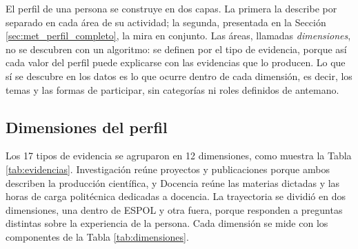 El perfil de una persona se construye en dos capas. La primera la describe por separado en cada área de su actividad; la segunda, presentada en la Sección \ref{sec:met_perfil_completo}, la mira en conjunto. Las áreas, llamadas \textit{dimensiones}, no se descubren con un algoritmo: se definen por el tipo de evidencia, porque así cada valor del perfil puede explicarse con las evidencias que lo producen. Lo que sí se descubre en los datos es lo que ocurre dentro de cada dimensión, es decir, los temas y las formas de participar, sin categorías ni roles definidos de antemano.

\subsection{Dimensiones del perfil}

Los 17 tipos de evidencia se agruparon en 12 dimensiones, como muestra la Tabla \ref{tab:evidencias}. Investigación reúne proyectos y publicaciones porque ambos describen la producción científica, y Docencia reúne las materias dictadas y las horas de carga politécnica dedicadas a docencia. La trayectoria se dividió en dos dimensiones, una dentro de ESPOL y otra fuera, porque responden a preguntas distintas sobre la experiencia de la persona. Cada dimensión se mide con los componentes de la Tabla \ref{tab:dimensiones}.


